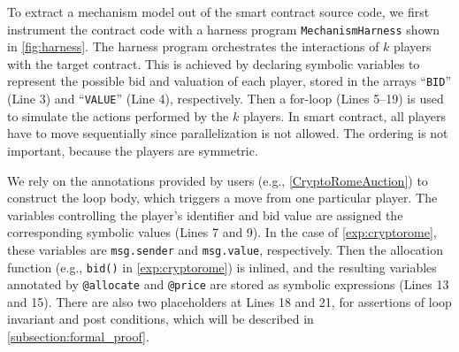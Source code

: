 
To extract a mechanism model out of the smart contract source code, we first instrument the
contract code with a harness program \texttt{MechanismHarness} shown in \cref{fig:harness}.
The harness program orchestrates the interactions of $k$ players with the target contract.
This is achieved by declaring symbolic variables to represent the possible bid and valuation of
each player, stored in the arrays ``\texttt{BID}'' (Line 3) and ``\texttt{VALUE}'' (Line 4),
respectively.
Then a for-loop (Lines 5--19) is used to simulate the actions performed by the $k$ players.
In smart contract, all players have to move sequentially since parallelization is not allowed.
The ordering is not important, because the players are symmetric.

We rely on the annotations provided by users (e.g., \cref{CryptoRomeAuction}) to construct the
loop body, which triggers a move from one particular player.
The variables controlling the player's identifier and bid value are assigned the corresponding
symbolic values (Lines 7 and 9).
In the case of \cref{exp:cryptorome}, these variables are \texttt{msg.sender} and
\texttt{msg.value}, respectively.
Then the allocation function (e.g., \texttt{bid()} in \cref{exp:cryptorome}) is inlined, and
the resulting variables annotated by \texttt{@allocate} and \texttt{@price} are stored as symbolic
expressions (Lines 13 and 15).
There are also two placeholders at Lines 18 and 21, for assertions of loop invariant and post
conditions, which will be described in \cref{subsection:formal_proof}.

